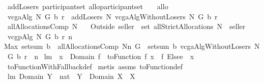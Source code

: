 \begin{isabellebody}
\isamarkupfalse%
\ {\isachardoublequoteopen}addLosers\ participantset\ allo{\isacharequal}{\isacharequal}{\isacharparenleft}participantset\ {\isasymtimes}\ {\isacharbraceleft}{\isacharbraceleft}{\isacharbraceright}{\isacharbraceright}{\isacharparenright}\ {\isacharplus}{\isacharasterisk}\ allo{\isachardoublequoteclose}\isanewline
{}\isamarkupfalse%
\ {\isachardoublequoteopen}vcgaAlg\ N\ G\ b\ r\ {\isacharequal}\ addLosers\ N\ {\isacharparenleft}vcgaAlgWithoutLosers\ N\ G\ b\ r{\isacharparenright}{\isachardoublequoteclose}\isanewline
{}\isamarkupfalse%
\ {\isachardoublequoteopen}allAllocationsComp\ N\ {\isasymOmega}\ {\isacharequal}{\isacharequal}\ \isanewline
{\isacharparenleft}Outside{\isacharprime}\ {\isacharbraceleft}seller{\isacharbraceright}{\isacharparenright}\ {\isacharbackquote}\ set\ {\isacharparenleft}allStrictAllocations\ {\isacharparenleft}N\ {\isasymunion}\ {\isacharbraceleft}seller{\isacharbraceright}{\isacharparenright}\ {\isasymOmega}{\isacharparenright}{\isachardoublequoteclose}\isanewline
{}\isamarkupfalse%
\ {\isachardoublequoteopen}vcgpAlg\ N\ G\ b\ r\ n\ {\isacharequal}\isanewline
Max\ {\isacharparenleft}setsum\ b\ {\isacharbackquote}\ {\isacharparenleft}allAllocationsComp\ {\isacharparenleft}N{\isacharminus}{\isacharbraceleft}n{\isacharbraceright}{\isacharparenright}\ G{\isacharparenright}{\isacharparenright}\ {\isacharminus}\ {\isacharparenleft}setsum\ b\ {\isacharparenleft}vcgaAlgWithoutLosers\ N\ G\ b\ r\ {\isacharminus}{\isacharminus}\ n{\isacharparenright}{\isacharparenright}{\isachardoublequoteclose}\isanewline
\isanewline
{}\isamarkupfalse%
\ lm{}{}{\isacharcolon}\ \ {\isachardoublequoteopen}x\ {\isasymin}\ Domain\ f{\isachardoublequoteclose}\ \ {\isachardoublequoteopen}toFunction\ f\ x\ {\isacharequal}\ {\isacharparenleft}f\ Elsee\ {}{\isacharparenright}\ x{\isachardoublequoteclose}\isanewline
%
\isadelimproof
%
\endisadelimproof
%
\isatagproof
{}\isamarkupfalse%
\ toFunctionWithFallback{}{\isacharunderscore}def\isanewline
{}\isamarkupfalse%
\ {\isacharparenleft}metis\ assms\ toFunction{\isacharunderscore}def{\isacharparenright}%
\endisatagproof
{\isafoldproof}%
%
\isadelimproof
\isanewline
%
\endisadelimproof
{}\isamarkupfalse%
\ lm{}{}{\isacharcolon}\ {\isachardoublequoteopen}Domain\ {\isacharparenleft}Y\ {\isasymtimes}\ {\isacharbraceleft}{}{\isacharcolon}{\isacharcolon}nat{\isacharbraceright}{\isacharparenright}\ {\isacharequal}\ Y\ {\isacharampersand}\ Domain\ {\isacharparenleft}X\ {\isasymtimes}\ {\isacharbraceleft}{}{\isacharbraceright}{\isacharparenright}{\isacharequal}X{\isachardoublequoteclose}%

\end{isabellebody}
